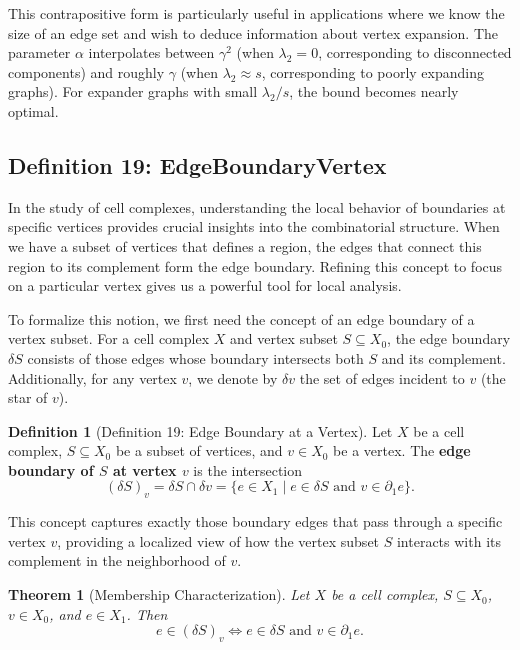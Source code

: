 \documentclass[11pt]{article}
\theoremstyle{plain}
\newtheorem*{theorem}{Theorem}
\theoremstyle{definition}
\newtheorem*{definition}{Definition}
\theoremstyle{remark}
\begin{document}
This contrapositive form is particularly useful in applications where we know the size of an edge set and wish to deduce information about vertex expansion. The parameter $\alpha$ interpolates between $\gamma^2$ (when $\lambda_2 = 0$, corresponding to disconnected components) and roughly $\gamma$ (when $\lambda_2 \approx s$, corresponding to poorly expanding graphs). For expander graphs with small $\lambda_2/s$, the bound becomes nearly optimal.

\vspace{1em}

\subsection{Definition 19: EdgeBoundaryVertex}

In the study of cell complexes, understanding the local behavior of boundaries at specific vertices provides crucial insights into the combinatorial structure. When we have a subset of vertices that defines a region, the edges that connect this region to its complement form the edge boundary. Refining this concept to focus on a particular vertex gives us a powerful tool for local analysis.

To formalize this notion, we first need the concept of an edge boundary of a vertex subset. For a cell complex $X$ and vertex subset $S \subseteq X_0$, the edge boundary $\delta S$ consists of those edges whose boundary intersects both $S$ and its complement. Additionally, for any vertex $v$, we denote by $\delta v$ the set of edges incident to $v$ (the star of $v$).

\begin{definition}[Definition 19: Edge Boundary at a Vertex]
Let $X$ be a cell complex, $S \subseteq X_0$ be a subset of vertices, and $v \in X_0$ be a vertex. The \textbf{edge boundary of $S$ at vertex $v$} is the intersection
\[
(\delta S)_v = \delta S \cap \delta v = \{e \in X_1 \mid e \in \delta S \text{ and } v \in \partial_1 e\}.
\]
\end{definition}

This concept captures exactly those boundary edges that pass through a specific vertex $v$, providing a localized view of how the vertex subset $S$ interacts with its complement in the neighborhood of $v$.

\begin{theorem}[Membership Characterization]
Let $X$ be a cell complex, $S \subseteq X_0$, $v \in X_0$, and $e \in X_1$. Then
\[
e \in (\delta S)_v \Longleftrightarrow e \in \delta S \text{ and } v \in \partial_1 e.
\]
\end{theorem}
\end{document}
